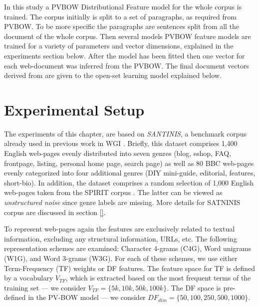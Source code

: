 In this study a PVBOW Distributional Feature model for the whole corpus is trained. The corpus initially is split to a set of paragraphs, as required from PVBOW. To be more specific the paragraphs are sentences split from all the document of the whole corpus. Then several models PVBOW feature models are trained for a variety of parameters and vector dimensions, explained in the experiments section below. After the model has been fitted then one vector for each web-document was inferred from the PVBOW. The final document vectors derived from  are given to the open-set learning model explained below. 


\section{Experimental Setup}\label{chap:word_embeddings:sec:experiments_setup}


The experiments of this chapter, are based on \textit{SANTINIS}, a benchmark corpus already used in previous work in WGI \parencite{mehler2010genres_on_web,pritsos2018open,santini2007automatic}. Briefly, this dataset comprises 1,400 English web-pages evenly distributed into seven genres (blog, eshop, FAQ, frontpage, listing, personal home page, search page) as well as 80 BBC web-pages evenly categorized into four additional genres (DIY mini-guide, editorial, features, short-bio). In addition, the dataset comprises a random selection of 1,000 English web-pages taken from the SPIRIT corpus \parencite{joho2004spirit}. The latter can be viewed as \textit{unstructured noise} since genre labels are missing. More details for SATNINIS corpus are discussed in section \ref{}. 



To represent web-pages again the features are exclusively related to textual information, excluding any structural information, URLs, etc. The following representation schemes are examined: Character 4-grams (C4G), Word unigrams (W1G), and Word 3-grams (W3G). For each of these schemes, we use either Term-Frequency (TF) weights or DF features. The feature space for TF is defined by a vocabulary $V_{TF}$, which is extracted based on the most frequent terms of the training set --- we consider $V_{TF}=\{5k,10k,50k,100k\}$. The DF space is pre-defined in the PV-BOW model --- we consider $DF_{dim}=\{50,100,250,500,1000\}$.

